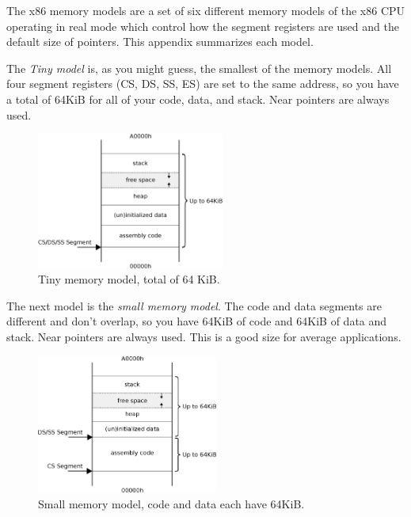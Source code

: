 \documentclass[book.tex]{subfiles}
\begin{document}
\label{appendix_memory_models}
The x86 memory models are a set of six different memory models of the x86 CPU operating in real mode which control how the segment registers are used and the default size of pointers. This appendix summarizes each model.\\

\par
The \textit{Tiny model} is, as you might guess, the smallest of the memory models. All
four segment registers (CS, DS, SS, ES) are set to the same address, so you have a total of 64KiB for all of your code, data, and stack. Near pointers are always used. \\
\begin{figure}[H]
\centering
\includegraphics[width=0.55\textwidth]{imgs/drawings/memory/tiny_mm.eps}
\caption{Tiny memory model, total of 64 KiB.}
\label{fig:mm_tiny}
\end{figure}

\pagebreak

The next model is the \textit{small memory model}. The code and data segments are different and don't overlap, so you have 64KiB of code and 64KiB of data and stack. Near pointers are
always used. This is a good size for average applications.\\
\begin{figure}[H]
\centering
\includegraphics[width=0.53\textwidth]{imgs/drawings/memory/small_mm.eps}
\caption{Small memory model, code and data each have 64KiB.}
\label{fig:mm_small}
\end{figure}
\end{document}
